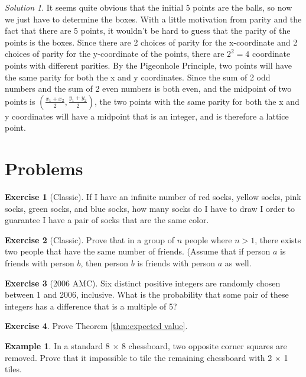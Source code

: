 \documentclass[l1pt]{article}
\theoremstyle{plain}
\theoremstyle{definition}
\newtheorem{example}[thm]{Example}
\newtheorem{exercise}{Exercise}[section]
\theoremstyle{remark}
\newtheorem*{solution}{Solution}
\begin{document}
\begin{solution}
It seems quite obvious that the initial 5 points are the balls, so now we just have to determine the boxes. With a little motivation from parity and the fact that there are 5 points, it wouldn't be hard to guess that the parity of the points is the boxes. Since there are 2 choices of parity for the x-coordinate and 2 choices of parity for the y-coordinate of the points, there are $2^2=4$ coordinate points with different parities. By the Pigeonhole Principle, two points will have the same parity for both the x and y coordinates. Since the sum of 2 odd numbers and the sum of 2 even numbers is both even, and the midpoint of two points is $\left (\frac{x_1+x_2}{2}, \frac{y_1+y_2}{2} \right )$, the two points with the same parity for both the x and y coordinates will have a midpoint that is an integer, and is therefore a lattice point.
\end{solution}




\bigskip


\section{Problems}

\begin{exercise}[Classic]
If I have an infinite number of red socks, yellow socks, pink socks, green socks, and blue socks, how many socks do I have to draw I order to guarantee I have a pair of socks that are the same color.
\end{exercise}

\begin{exercise}[Classic]
Prove that in a group of $n$ people where $n>1$, there exists two people that have the same number of friends. (Assume that if person $a$ is friends with person $b$, then person $b$ is friends with person $a$ as well. 
\end{exercise}

\begin{exercise}[2006 AMC]
 Six distinct positive integers are randomly chosen between 1 and 2006, inclusive. What is the probability that some pair of these integers has a difference that is a multiple of 5?
\end{exercise}

\begin{exercise}
 Prove Theorem \ref{thm:expected value}.
\end{exercise}

\begin{example}
In a standard 8 $\times$ 8 chessboard, two opposite corner squares are removed. Prove that it impossible to tile the remaining chessboard with 2 $\times$ 1 tiles.
\end{example}
\end{document}
